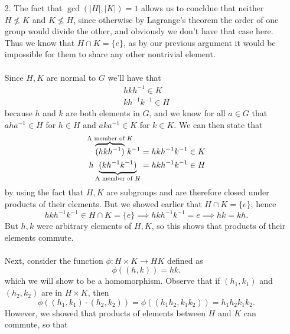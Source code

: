 \begin{prf}
\begin{itemize}
            \item[2.]The fact that $\gcd(|H|,|K|)=1$ allows us to concldue that neither 
            $H \not \le K$ and $K \not \le H$, since otherwise by Lagrange's theorem 
            the order of one group would divide the other, and obviously we don't have 
            that case here. Thus we know that $H \cap K = \{e\}$, as by our previous 
            argument it would be impossible for them to share any other nontrivial element.
            \\
            \\
            Since $H, K$ are 
            normal to $G$ we'll have that 
            \begin{align*}
                hkh^{-1} \in K\\
                kh^{-1}k^{-1} \in H
            \end{align*}
            because $h$ and $k$ are both elements in $G$, and we know 
            for all $a \in G$ that $aha^{-1} \in H$ for $h \in H$ and 
            $aka^{-1} \in K$ for $k \in K$.
            We can then state that 
            \begin{align*}
                \overbrace{(hkh^{-1})}^{\text{A member of }K} \hspace{-0.3cm}k^{-1} = hkh^{-1}k^{-1} \in K\\
                h\underbrace{(kh^{-1}k^{-1})}_{\text{A member of } H} = hkh^{-1}k^{-1} \in H
            \end{align*}
            by using the fact that $H, K$ are subgroups and are therefore closed under products 
            of their elements. But we showed earlier that $H \cap K = \{e\}$; hence 
            $$
            hkh^{-1}k^{-1} \in H \cap K = \{e\} \implies hkh^{-1}k^{-1} = e \implies hk = kh.
            $$
            But $h, k$ were arbitrary elements of $H, K$, so this shows that products of 
            their elements commute.
            \\
            \\
            Next, consider the function $\phi: H \times K \rightarrow
            HK$ defined as
            $$
            \phi((h, k)) = hk.
            $$
            which we will 
            show to be a homomorphism.
            Observe that if $(h_1, k_1)$ and $(h_2, k_2)$ are in $H \times K$, then 
            $$
            \phi((h_1, k_1)\cdot(h_2, k_2)) = \phi((h_1h_2, k_1k_2)) = h_1h_2k_1k_2.
            $$
            However, we showed that products of elements between $H$ and $K$ can commute, so that 

\end{itemize}
\end{prf}

